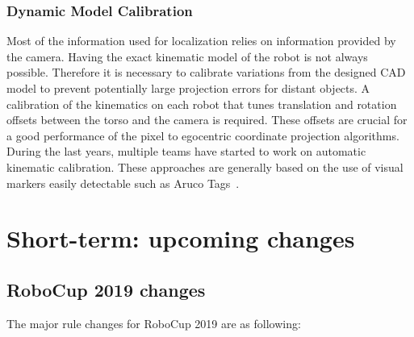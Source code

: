 \documentclass{article}
\begin{document}
\subsubsection{Dynamic Model Calibration}
Most of the information used for localization relies on information provided by the camera. 
Having the exact kinematic model of the robot is not always possible. 
Therefore it is necessary to calibrate variations from the designed CAD model to prevent potentially large projection errors for distant objects. 
A calibration of the kinematics on each robot that tunes translation and rotation offsets between the torso and the camera is required. 
These offsets are crucial for a good performance of the pixel to egocentric coordinate projection algorithms.
During the last years, multiple teams have started to work on automatic kinematic calibration. 
These approaches are generally based on the use of visual markers easily detectable such as Aruco Tags~\cite{Garrido-Jurado2014}.




\section{\label{sec:ShortTerm}Short-term: upcoming changes}

\subsection{RoboCup 2019 changes}

The major rule changes for RoboCup 2019 are as following:
\end{document}
